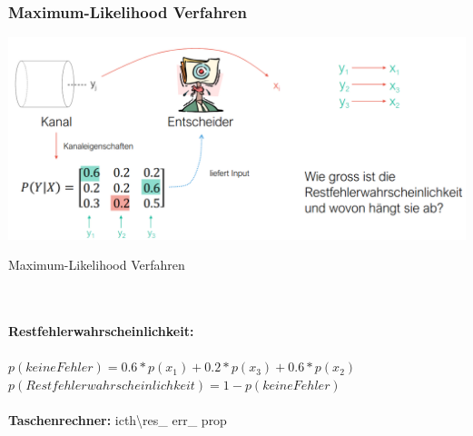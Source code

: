 \subsubsection{Maximum-Likelihood Verfahren}
\begin{minipage}[t]{0.9\textwidth}
	\centering
	\includegraphics[width=0.9\linewidth]{images/maximumlikelihood}
	\caption{Maximum-Likelihood Verfahren}
	\label{fig:maximumlikelihood}
\end{minipage}
\\
\\
\textbf{Restfehlerwahrscheinlichkeit:} \\ \\
$p(keineFehler)=0.6*p(x_1)+0.2*p(x_3)+0.6*p(x_2)$ \\
$p(Restfehlerwahrscheinlichkeit)=1-p(keineFehler)$
\\
\\
\textbf{Taschenrechner:} icth\textbackslash res\_ err\_ prop

\clearpage
